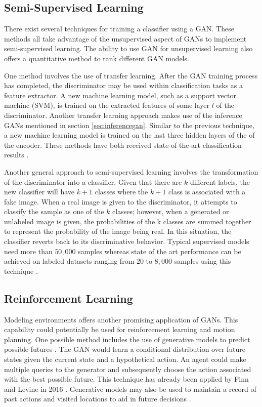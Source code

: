 \documentclass[11pt]{article}
\begin{document}
\subsection{Semi-Supervised Learning} \label{sec:semisupervised}
There exist several techniques for training a classifier using a GAN. These methods all take advantage of the unsupervised aspect of GANs to implement semi-supervised learning. The ability to use GAN for unsupervised learning also offers a quantitative method to rank different GAN models.

One method involves the use of transfer learning. After the GAN training process has completed, the discriminator may be used within classification tasks as a feature extractor. A new machine learning model, such as a support vector machine (SVM), is trained on the extracted features of some layer $l$ of the discriminator. Another transfer learning approach makes use of the inference GANs mentioned in section \ref{sec:inferencegan}. Similar to the previous technique, a new machine learning model is trained on the last three hidden layers of the of the encoder. These methods have both received state-of-the-art classification results \citep{2017arXiv171007035C}.

Another general approach to semi-supervised learning involves the transformation of the discriminator into a classifier. Given that there are $k$ different labels, the new classifier will have $k + 1$ classes where the $k + 1$ class is associated with a fake image. When a real image is given to the discriminator, it attempts to classify the sample as one of the $k$ classes; however, when a generated or unlabeled image is given, the probabilities of the k classes are summed together to represent the probability of the image being real. In this situation, the classifier reverts back to its discriminative behavior. Typical supervised models need more than $50,000$ samples whereas state of the art performance can be achieved on labeled datasets ranging from $20$ to $8,000$ samples using this technique \citep{2017arXiv170100160G}.

\subsection{Reinforcement Learning}
Modeling environments offers another promising application of GANs. This capability could potentially be used for reinforcement learning and motion planning. One possible method includes the use of generative models to predict possible futures \citep{2017arXiv170100160G}. The GAN would learn a conditional distribution over future states given the current state and a hypothetical action. An agent could make multiple queries to the generator and subsequently choose the action associated with the best possible future. This technique has already been applied by Finn and Levine in 2016 \citep{2016arXiv161000696F}. Generative models may also be used to maintain a record of past actions and visited locations to aid in future decisions \citep{2017arXiv170100160G}.
\end{document}
